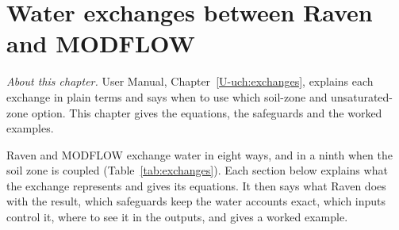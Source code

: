 \chapter{Water exchanges between Raven and MODFLOW}\label{ch:c4}
\noindent\emph{About this chapter.} User Manual, Chapter~\ref{U-uch:exchanges}, explains each exchange in
plain terms and says when to use which soil-zone and unsaturated-zone option. This chapter gives the equations, the
safeguards and the worked examples.

Raven and MODFLOW exchange water in eight ways, and in a ninth when the soil zone is coupled (Table~\ref{tab:exchanges}). Each section below explains what the exchange represents and gives its equations. It then says what Raven does with the
result, which safeguards keep the water accounts exact, which inputs control it, where to see it in the outputs, and gives
a worked example.

